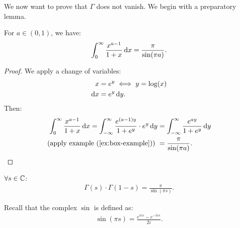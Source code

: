 We now want to prove that $\Gamma$ does not vanish. We begin with a preparatory lemma.

\begin{lemma}\label{lem:g-integral-calc-lemma}
For $a \in (0,1)$, we have:
\begin{align*}
    \int_0^\infty \frac{x^{a-1}}{1+x}\dif x = \frac{\pi}{\sin(\pi a)}.
\end{align*}
\end{lemma}


\begin{proof}
We apply a change of variables:
\begin{align*}
    x &= e^y \iff y = \log(x)\\
    \dif x &= e^y \dif y.
\end{align*}
Then:
\begin{align*}
    \int_0^\infty \frac{x^{a-1}}{1+x} \dif x = \int_{- \infty}^\infty \frac{e^{(a-1)y}}{1+e^y}\cdot e^y \dif y &= \int_{-\infty }^\infty \frac{e^{ay}}{1+e^y} \dif y\\
     \text{(apply example (\ref{ex:box-example})) } &= \frac{\pi}{\sin(\pi a)}.
\end{align*}
\end{proof}


\begin{theorem}\label{thm:g-f-eq}
$\forall s \in \mathbb{C}$: 
\begin{align*}
\Gamma(s) \cdot \Gamma(1-s) = \frac{\pi}{\sin(\pi s)}.
\end{align*}

\end{theorem}

\begin{note}
Recall that the complex $\sin$ is defined as:
\begin{align*}
    \sin(\pi s) = \frac{e^{\pi i s} - e^{- \pi i s}}{2i}.
\end{align*}
\end{note}

